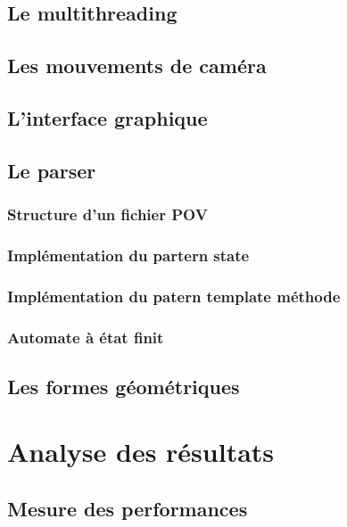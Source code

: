\documentclass[11pt]{article}
\begin{document}
    \subsection{Le multithreading}

        

    \subsection{Les mouvements de caméra}
        \label{mouvementsCamera}

        

    \subsection{L'interface graphique}

    

    \subsection{Le parser}
        \subsubsection{Structure d'un fichier POV}
        \subsubsection{Implémentation du partern state}
        \subsubsection{Implémentation du patern template méthode}
        \subsubsection{Automate à état finit}


    \subsection{Les formes géométriques}




\section{Analyse des résultats}
    \subsection{Mesure des performances}
        
\end{document}
